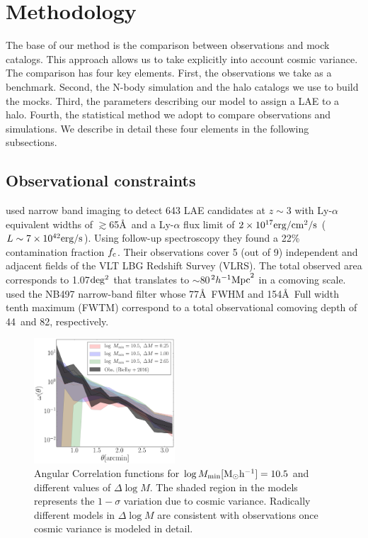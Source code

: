 \documentclass{emulateapj}
\newcommand{\hMpc}{{\ifmmode{h^{-1}{\rm Mpc}}\else{$h^{-1}$Mpc}\fi}}
\begin{document}
\section{Methodology}

The base of our method is the comparison between observations and mock
catalogs. 
This approach allows us to take explicitly into account cosmic variance. 
The comparison has four key elements. 
First, the observations we take as a benchmark. 
Second, the N-body simulation and the halo catalogs we use to build
the mocks. 
Third, the parameters describing our model to
assign a LAE to a halo. 
Fourth, the statistical method we adopt to compare observations and
simulations.  
We describe in detail these four elements in the following subsections.




\subsection{Observational constraints}
\label{subsec:obs}
\citet{Bielby16} used narrow band imaging to detect 643 LAE candidates
at $z\sim 3$  with Ly-$\alpha$ equivalent widths of $\gtrsim$65\AA\ and a Ly-$\alpha$ flux limit
of $2\times10^{17}{\rm erg/cm^2/s}$ ($L\sim 7\times10^{42}{\rm erg/s} $). 
Using follow-up spectroscopy they found a 22\% contamination fraction $f_{\rm c}$.
Their observations cover 5 (out of 9) independent and adjacent
fields of the VLT LBG Redshift Survey (VLRS).  
The  total observed  area corresponds to 1.07$\rm deg^2$ that translates to
$\sim$80$^2\hMpc^2$ in a comoving scale. 
\citet{Bielby16} used the NB497  narrow-band filter whose 77\AA\ FWHM
and 154\AA\ Full width  tenth maximum (FWTM) correspond to a total observational comoving depth of
44\hMpc\  and 82\hMpc, respectively. 

\begin{figure}
  \includegraphics[width=0.47\textwidth]{fig5.pdf}
\caption{ Angular Correlation functions for $\log M_{\rm
    min}[\rm{M_{\odot}h^{-1}}]=10.5$ and different values of $\Delta \log
  M$.  
  The shaded region in the models represents the $1-\sigma$ variation
  due to cosmic variance. Radically different models in $\Delta \log M$ are consistent with
  observations once cosmic variance is modeled in detail.} 
\label{fig:corr}
\end{figure}
\end{document}
